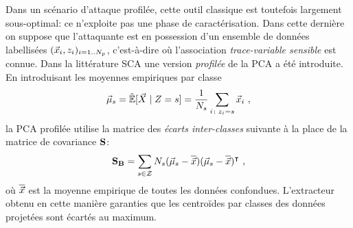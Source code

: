 Dans un sc\'{e}nario d'attaque profil\'{e}e, cette outil classique est toutefois largement sous-optimal: ce n'exploite pas une phase de caract\'{e}risation. Dans cette derni\`{e}re on suppose que l'attaquante est en possession d'un ensemble de donn\'{e}es labellis\'{e}es  $(\vec{x}_i, z_i)_{i=1..N_p}$, c'est-\`{a}-dire o\`{u} l'association \emph{trace-variable sensible} est connue. Dans la litt\'{e}rature SCA \cite{TAprincipal,choudaryefficient,choudary2014efficient,disassembler,Standaert2008} une version \emph{profil\'{e}e} de la PCA a \'{e}t\'{e} introduite. En introduisant les moyennes empiriques par classe
\begin{equation}\label{eq:mmmXclass}
\mmmXclass= \esperEst[\given{\vaLeakVec}{\sensRandVar = \sensVarGenValue}] = \frac{1}{\nbTracesPerClass}\sum_{i\colon \sensVar_i=\sensVarGenValue} \vLeakVec_i  \mbox{ ,}
\end{equation}
la PCA profil\'{e}e utilise la matrice des \emph{\'{e}carts inter-classes} suivante \`{a} la place de la matrice de covariance $\textbf{S}$:
\begin{equation}\label{eq:SB}
\textbf{S}_{\textbf{B}} = \sum_{s\in\mathcal{Z}}N_{s}(\vec{\mu}_{s}-\overline{\vec{x}})(\vec{\mu}_{s}-\overline{\vec{x}})^\intercal \mbox{ ,}
\end{equation}
o\`{u} $\overline{\vec{x}}$ est la moyenne empirique de toutes les donn\'{e}es confondues. L'extracteur obtenu en cette mani\`{e}re garanties que les centro\"ides par classes des donn\'{e}es projet\'{e}es sont \'{e}cart\'{e}s au maximum.


